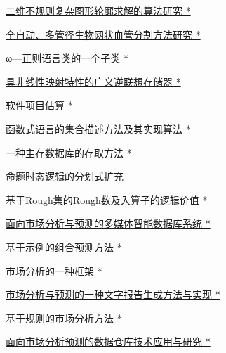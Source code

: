 \documentclass[a4paper]{article}
\begin{document}
\href{http://www.jos.org.cn/ch/reader/download_pdf.aspx?file_no=1996s158&year_id=1996&quarter_id=zk&falg=1}{二维不规则复杂图形轮廓求解的算法研究 *}

\href{http://www.jos.org.cn/ch/reader/download_pdf.aspx?file_no=1996s159&year_id=1996&quarter_id=zk&falg=1}{全自动、多管径生物网状血管分割方法研究 *}

\href{http://www.jos.org.cn/ch/reader/download_pdf.aspx?file_no=1996s160&year_id=1996&quarter_id=zk&falg=1}{ω—正则语言类的一个子类 *}

\href{http://www.jos.org.cn/ch/reader/download_pdf.aspx?file_no=1996s161&year_id=1996&quarter_id=zk&falg=1}{具非线性映射特性的广义逆联想存储器 *}

\href{http://www.jos.org.cn/ch/reader/download_pdf.aspx?file_no=1996s162&year_id=1996&quarter_id=zk&falg=1}{软件项目估算 *}

\href{http://www.jos.org.cn/ch/reader/download_pdf.aspx?file_no=1996s163&year_id=1996&quarter_id=zk&falg=1}{函数式语言的集合描述方法及其实现算法 *}

\href{http://www.jos.org.cn/ch/reader/download_pdf.aspx?file_no=1996s164&year_id=1996&quarter_id=zk&falg=1}{一种主存数据库的存取方法 *}

\href{http://www.jos.org.cn/ch/reader/download_pdf.aspx?file_no=1996s165&year_id=1996&quarter_id=zk&falg=1}{命题时态逻辑的分划式扩充}

\href{http://www.jos.org.cn/ch/reader/download_pdf.aspx?file_no=1996s166&year_id=1996&quarter_id=zk&falg=1}{基于Rough集的Rough数及入算子的逻辑价值 *}

\href{http://www.jos.org.cn/ch/reader/download_pdf.aspx?file_no=1996s167&year_id=1996&quarter_id=zk&falg=1}{面向市场分析与预测的多媒体智能数据库系统 *}

\href{http://www.jos.org.cn/ch/reader/download_pdf.aspx?file_no=1996s168&year_id=1996&quarter_id=zk&falg=1}{基于示例的组合预测方法 *}

\href{http://www.jos.org.cn/ch/reader/download_pdf.aspx?file_no=1996s169&year_id=1996&quarter_id=zk&falg=1}{市场分析的一种框架 *}

\href{http://www.jos.org.cn/ch/reader/download_pdf.aspx?file_no=1996s170&year_id=1996&quarter_id=zk&falg=1}{市场分析与预测的一种文字报告生成方法与实现 *}

\href{http://www.jos.org.cn/ch/reader/download_pdf.aspx?file_no=1996s171&year_id=1996&quarter_id=zk&falg=1}{基于规则的市场分析方法 *}

\href{http://www.jos.org.cn/ch/reader/download_pdf.aspx?file_no=1996s172&year_id=1996&quarter_id=zk&falg=1}{面向市场分析预测的数据仓库技术应用与研究 *}
\end{document}
